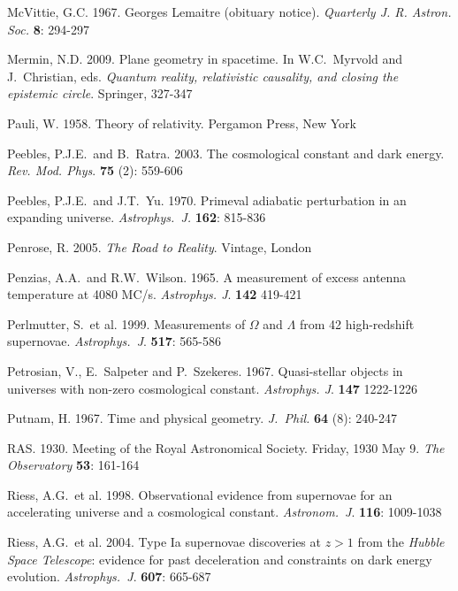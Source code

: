 \documentclass[12 pt]{article}
\begin{document}
\begin{thebibliography}{}
 McVittie, G.C. 1967. Georges Lemaitre (obituary notice). \textit{Quarterly J. R. Astron. Soc.} \textbf{8}: 294-297

 Mermin, N.D. 2009. Plane geometry in spacetime. In W.C.\ Myrvold and J.\ Christian, eds. \textit{Quantum reality, relativistic causality, and closing the epistemic circle}. Springer, 327-347

 Pauli, W. 1958. Theory of relativity. Pergamon Press, New York
 
 Peebles, P.J.E.\ and B.\ Ratra. 2003. The cosmological constant and dark energy. \textit{Rev. Mod. Phys}. \textbf{75} (2): 559-606

 Peebles, P.J.E.\ and J.T.\ Yu. 1970. Primeval adiabatic perturbation in an expanding universe. \textit{Astrophys.\ J.} \textbf{162}: 815-836

 Penrose, R. 2005. \textit{The Road to Reality}. Vintage, London

 Penzias, A.A.\ and R.W.\ Wilson. 1965. A measurement of excess antenna temperature at 4080 MC/s. \textit{Astrophys. J}. \textbf{142} 419-421

 Perlmutter, S.\ et al. 1999. Measurements of $\Omega$ and $\Lambda$ from 42 high-redshift supernovae. \textit{Astrophys.\ J}. \textbf{517}: 565-586

 Petrosian, V., E.\ Salpeter and P.\ Szekeres. 1967. Quasi-stellar objects in universes with non-zero cosmological constant. \textit{Astrophys. J}. \textbf{147} 1222-1226

 Putnam, H. 1967. Time and physical geometry. \textit{J.\ Phil.} \textbf{64} (8): 240-247

 RAS. 1930. Meeting of the Royal Astronomical Society. Friday, 1930 May 9. \textit{The Observatory} \textbf{53}: 161-164

 Riess, A.G.\ et al. 1998. Observational evidence from supernovae for an accelerating universe and a cosmological constant. \textit{Astronom.\ J}. \textbf{116}: 1009-1038

 Riess, A.G.\ et al. 2004. Type Ia supernovae discoveries at $z > 1$ from the \textit{Hubble Space Telescope}: evidence for past deceleration and constraints on dark energy evolution. \textit{Astrophys.\ J}. \textbf{607}: 665-687


\end{thebibliography}
\end{document}
